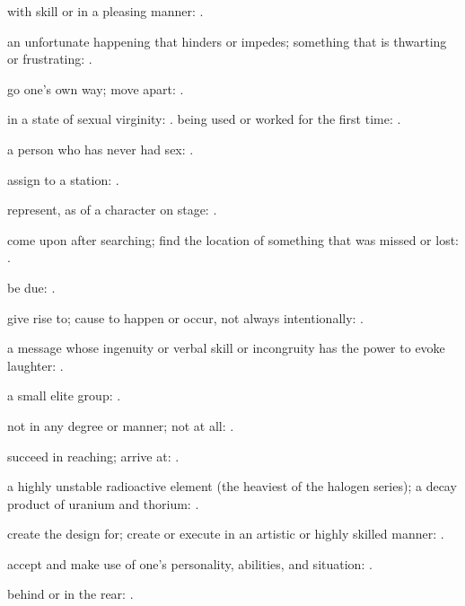   with skill or in a pleasing manner: .

  an unfortunate happening that hinders or impedes; something that is thwarting or frustrating:   .

  go one's own way; move apart:   .

  in a state of sexual virginity:   . being used or worked for the first time: .

  a person who has never had sex: .

  assign to a station:   .

  represent, as of a character on stage:   .

  come upon after searching; find the location of something that was missed or lost:   .

  be due: .

  give rise to; cause to happen or occur, not always intentionally:   .

  a message whose ingenuity or verbal skill or incongruity has the power to evoke laughter:   .

  a small elite group: .

  not in any degree or manner; not at all: .

  succeed in reaching; arrive at: .

  a highly unstable radioactive element (the heaviest of the halogen series); a decay product of uranium and thorium:   .

  create the design for; create or execute in an artistic or highly skilled manner: .

  accept and make use of one's personality, abilities, and situation:   .

  behind or in the rear: .

